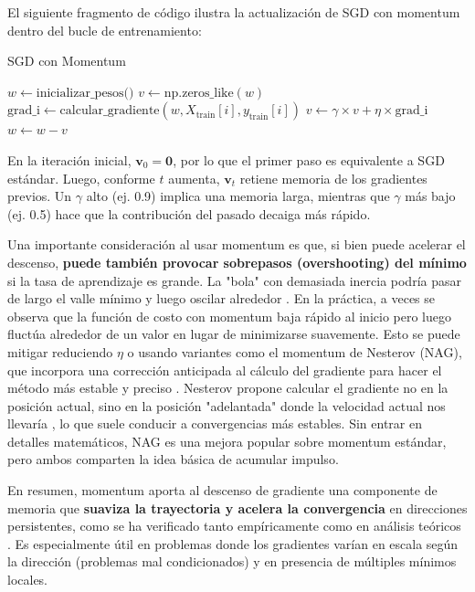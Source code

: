 \documentclass[12pt, spanish]{article}
\begin{document}
El siguiente fragmento de código ilustra la actualización de SGD con momentum dentro del bucle de entrenamiento:

\begin{algorithm}[H]
\caption{SGD con Momentum}
\begin{algorithmic}[1]
\State $w \gets \text{inicializar\_pesos()}$
\State $v \gets \text{np.zeros\_like}(w)$ 
        \State $\text{grad\_i} \gets \text{calcular\_gradiente}(w, X_{\text{train}}[i], y_{\text{train}}[i])$
        \State $v \gets \gamma \times v + \eta \times \text{grad\_i}$ 
        \State $w \gets w - v$ 
    \EndFor
\EndFor
\end{algorithmic}
\end{algorithm}

En la iteración inicial, $\mathbf{v}_0 = \mathbf{0}$, por lo que el primer paso es equivalente a SGD estándar. Luego, conforme $t$ aumenta, $\mathbf{v}_t$ retiene memoria de los gradientes previos. Un $\gamma$ alto (ej. 0.9) implica una memoria larga, mientras que $\gamma$ más bajo (ej. 0.5) hace que la contribución del pasado decaiga más rápido.

Una importante consideración al usar momentum es que, si bien puede acelerar el descenso, \textbf{puede también provocar sobrepasos (overshooting) del mínimo} si la tasa de aprendizaje es grande. La "bola" con demasiada inercia podría pasar de largo el valle mínimo y luego oscilar alrededor \cite{ref4}. En la práctica, a veces se observa que la función de costo con momentum baja rápido al inicio pero luego fluctúa alrededor de un valor en lugar de minimizarse suavemente. Esto se puede mitigar reduciendo $\eta$ o usando variantes como el momentum de Nesterov (NAG), que incorpora una corrección anticipada al cálculo del gradiente para hacer el método más estable y preciso \cite{ref4}. Nesterov propone calcular el gradiente no en la posición actual, sino en la posición "adelantada" donde la velocidad actual nos llevaría \cite{ref4}, lo que suele conducir a convergencias más estables. Sin entrar en detalles matemáticos, NAG es una mejora popular sobre momentum estándar, pero ambos comparten la idea básica de acumular impulso.

En resumen, momentum aporta al descenso de gradiente una componente de memoria que \textbf{suaviza la trayectoria y acelera la convergencia} en direcciones persistentes, como se ha verificado tanto empíricamente como en análisis teóricos \cite{ref4}. Es especialmente útil en problemas donde los gradientes varían en escala según la dirección (problemas mal condicionados) y en presencia de múltiples mínimos locales.
\end{document}
